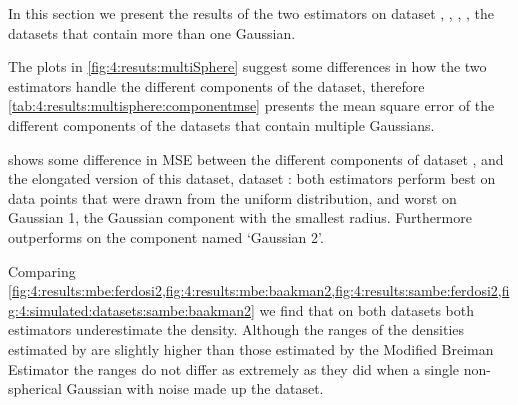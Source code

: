 In this section we present the results of the two estimators on dataset \ferdosiTwo, \baakmanTwo, \ferdosiThree, \baakmanThree, \ie the datasets that contain more than one Gaussian.

The plots in \cref{fig:4:resuts:multiSphere} suggest some differences in how the two estimators handle the different components of the dataset, therefore \cref{tab:4:results:multisphere:componentmse} presents the mean square error of the different components of the datasets that contain multiple Gaussians. 

\begin{table*}
	\centering
	
	\caption{The mean squared error of the known densities and the densities estimated by the Modified Breiman Estimator (\mbe) and the shape-adaptive MBE (\sambe), respectively, for the different components of the datasets with multiple Gaussians.} 	
	\label{tab:4:results:multisphere:componentmse}
\end{table*}

	 shows some difference in MSE between the different components of dataset \ferdosiTwo, and the elongated version of this dataset, \ie dataset \baakmanTwo: both estimators perform best on data points that were drawn from the uniform distribution, and worst on Gaussian 1, the Gaussian component with the smallest radius. Furthermore \sambe outperforms \mbe on the component named `Gaussian 2'.

	Comparing \cref{fig:4:results:mbe:ferdosi2,fig:4:results:mbe:baakman2,fig:4:results:sambe:ferdosi2,fig:4:simulated:datasets:sambe:baakman2} we find that on both datasets both estimators underestimate the density. Although the ranges of the densities estimated by \sambe are slightly higher than those estimated by the Modified Breiman Estimator the ranges do not differ as extremely as they did when a single non-spherical Gaussian with noise made up the dataset. 






\begin{figure*}
	\centering
	
	\caption{Comparative plots for dataset \ferdosiTwoNum, \ferdosiThreeNum, \baakmanTwoNum, and \baakmanThreeNum.}
	\label{fig:4:resuts:multiSphere}
\end{figure*}